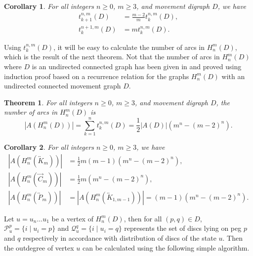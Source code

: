 \documentclass[letterpaper,11pt]{article}
\newtheorem{theorem}{Theorem}
\newtheorem{corollary}{Corollary}
\begin{document}
\begin{corollary}
For all integers $n\geq 0$, $m\geq 3$, and movement digraph $D$,  we have
\begin{align}
    t_{k+1}^{n,m}(D)&=\frac{m-2}{m}t_{k}^{n,m}(D),\\
    t_{k}^{n+1,m}(D)&=m t_{k}^{n,m}(D).
\end{align}
\end{corollary}




Using $t_{k}^{n,m}(D)$, it will be easy to calculate the number of arcs in $H_{n}^{m}(D)$, which is the result of the next theorem. Not that the number of arcs in $H_{n}^{m}(D)$ where $D$ is an undirected connected graph has been given in \cite{hinz2022dudeney} and proved using induction proof based on a  recurrence relation for the graphs  $H_{n}^{m}(D)$  with an undirected connected movement graph $D$.

\begin{theorem}
        For all integers $n\geq 0$, $m\geq 3$, and movement digraph $D$, the number of arcs in $H_{n}^{m}(D)$ is 
    \begin{equation}
        |A(H_{n}^{m}(D))|= \sum\limits_{k=1}^{n}t_{k}^{n,m}(D)=\frac{1}{2}|A(D)|(m^{n}-(m-2)^{n}).
    \end{equation}
\end{theorem}
\begin{corollary}
   For all integers $n\geq0$, $m\geq 3$, we have
\begin{align}
    |A(H_{n}^{m}(\overleftrightarrow{K}_{m}))|&=\frac{1}{2}m(m-1)(m^{n}-(m-2)^{n}),\\
    |A(H_{n}^{m}(\overrightarrow{C}_{m}))|&=\frac{1}{2}m(m^{n}-(m-2)^{n}),\\
    |A(H_{n}^{m}(\overleftrightarrow{P}_{m}))|&=|A(H_{n}^{m}(\overleftrightarrow{K}_{1,m-1}))|=(m-1)(m^{n}-(m-2)^{n}).
\end{align}
\end{corollary}




Let $u=u_{n}\ldots u_{1}$ be a vertex of $H_{n}^{m}(D)$, then for all $(p,q)\in D$,  $\mathcal{P}_{u}^{p}=\{i\mid u_{i}=p\}$ and $\mathcal{Q}_{u}^{q}=\{i\mid u_{i}=q\}$ represents the set of discs lying on peg $p$ and $q$ respectively in accordance with distribution of discs of the state $u$. Then the outdegree of vertex $u$ can be calculated  using the following simple algorithm.
\end{document}
